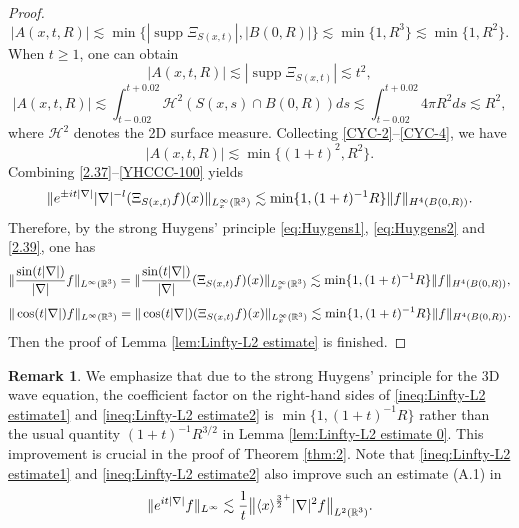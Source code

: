 \documentclass[11pt,twoside]{article}
\def\R{\mathop{\mathbb R\kern 0pt}\nolimits}
\def\f{\frac}
\def\ls{\lesssim}
\newcommand{\w}[1]{\langle {#1} \rangle}
\DeclareMathOperator{\supp}{supp}
\theoremstyle{plain}
\theoremstyle{definition}
\newtheorem{remark}{Remark}[section]
\numberwithin{equation}{section}
\begin{document}
\begin{proof}
\begin{equation}
 			|A(x,t,R)|\ls \min\{|\supp \Xi_{S(x,t)}|,|B(0,R)|\} \ls \min\{1,R^3\} \ls \min\{1,R^2\}.
 		\end{equation}
 		When $t \ge 1$, one can obtain
 		\begin{equation}\label{CYC-3}
 			|A(x,t,R)|\ls |\supp \Xi_{S(x,t)}| \ls t^2,
 		\end{equation}
 		\begin{equation}\label{CYC-4}
 			|A(x,t,R)|\ls \int_{t-0.02}^{t+0.02}\mathcal{H}^2(S(x,s)\cap B(0,R))ds \ls \int_{t-0.02}^{t+0.02}4\pi R^2ds \ls R^2,
 		\end{equation}
 		where $\mathcal{H}^2$ denotes the 2D surface measure. Collecting \eqref{CYC-2}--\eqref{CYC-4}, we have
		\begin{equation}\label{YHCCC-100}
			|A(x,t,R)|\ls \min\{(1+t)^2,R^2\}.
		\end{equation}
		Combining \eqref{2.37}--\eqref{YHCCC-100} yields
		\begin{equation}\label{2.39}
			\|e^{\pm it|\nabla|}|\nabla|^{-l}(\Xi_{S(x,t)}f)(x)\|_{L_x^\infty(\R^3)}
			\ls \min\{1,(1+t)^{-1}R\}\|f\|_{H^4(B(0,R))}.
		\end{equation}
		Therefore, by the strong Huygens' principle \eqref{eq:Huygens1}, \eqref{eq:Huygens2} and \eqref{2.39}, one has
		\begin{equation*}
			\|\f{\sin(t|\nabla|)}{|\nabla|}f\|_{L^{\infty}(\R^3)} =\|\f{\sin(t|\nabla|)}{|\nabla|}(\Xi_{S(x,t)}f)(x)\|_{L_x^\infty(\R^3)}  \lesssim \min\{1,(1+t)^{-1}R\}\| f\|_{H^{4}(B(0,R))},
		\end{equation*}
		\begin{equation*}
			\|\cos(t|\nabla|)f\|_{L^{\infty}(\R^3)} =\|\cos(t|\nabla|)(\Xi_{S(x,t)}f)(x)\|_{L_x^\infty(\R^3)}\lesssim  \min\{1,(1+t)^{-1}R\}\| f\|_{H^{4}(B(0,R))}.
		\end{equation*}
		Then the proof of Lemma \ref{lem:Linfty-L2 estimate} is finished.
	\end{proof}
\begin{remark}\label{rmk:3.1}
We emphasize that due to the strong Huygens' principle for the 3D wave equation, the coefficient factor on the right-hand sides of \eqref{ineq:Linfty-L2 estimate1} and  \eqref{ineq:Linfty-L2 estimate2} is $\min\{1, (1+t)^{-1}R\}$
rather than the usual quantity $(1+t)^{-1}R^{3/2}$ in Lemma \ref{lem:Linfty-L2 estimate 0}. This improvement is crucial
in the proof of Theorem \ref{thm:2}. Note that \eqref{ineq:Linfty-L2 estimate1} and  \eqref{ineq:Linfty-L2 estimate2} also improve
such an estimate (A.1) in \cite{Pusateri}
	\[
	\|e^{it|\nabla|}f\|_{L^\infty}\ls \f{1}{t}\big\|\w{x}^{\f{3}{2}^+}|\nabla|^2 f\big\|_{L^2(\R^3)}.
	\]
\end{remark}
\end{document}
